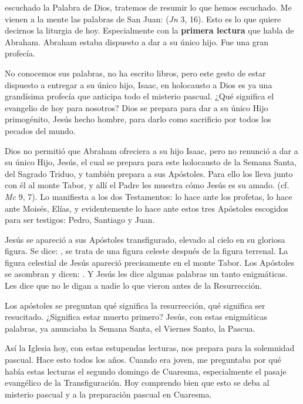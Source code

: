 \begin{body}
 escuchado la Palabra de Dios, tratemos de resumir lo que hemos escuchado. Me vienen a la mente las palabras de San Juan:  (\textit{Jn} 3, 16). Esto es lo que quiere decirnos la liturgia de hoy. Especialmente con la \textbf{primera lectura} que habla de Abraham. Abraham estaba dispuesto a dar a su único hijo. Fue una gran profecía.

No conocemos sus palabras, no ha escrito libros, pero este gesto de estar dispuesto a entregar a su único hijo, Isaac, en holocausto a Dios es ya una grandísima profecía que anticipa todo el misterio pascual. ¿Qué significa el evangelio de hoy para nosotros? Dios se prepara para dar a su único Hijo primogénito, Jesús hecho hombre, para darlo como sacrificio por todos los pecados del mundo.

Dios no permitió que Abraham ofreciera a su hijo Isaac, pero no renunció a dar a su único Hijo, Jesús, el cual se prepara para este holocausto de la Semana Santa, del Sagrado Triduo, y también prepara a sus Apóstoles. Para ello los lleva junto con él al monte Tabor, y allí el Padre les muestra cómo Jesús es su amado.  (cf. \textit{Mc} 9, 7). Lo manifiesta a los dos Testamentos: lo hace ante los profetas, lo hace ante Moisés, Elías, y evidentemente lo hace ante estos tres Apóstoles escogidos para ser testigos: Pedro, Santiago y Juan.

Jesús se apareció a sus Apóstoles transfigurado, elevado al cielo en su gloriosa figura. Se dice: , se trata de una figura celeste después de la figura terrenal. La figura celestial de Jesús apareció precisamente en el monte Tabor. Los Apóstoles se asombran y dicen: . Y Jesús les dice algunas palabras un tanto enigmáticas. Les dice que no le digan a nadie lo que vieron antes de la Resurrección.

Los apóstoles se preguntan qué significa la resurrección, qué significa ser resucitado. ¿Significa estar muerto primero? Jesús, con estas enigmáticas palabras, ya anunciaba la Semana Santa, el Viernes Santo, la Pascua.

Así la Iglesia hoy, con estas estupendas lecturas, nos prepara para la solemnidad pascual. Hace esto todos los años. Cuando era joven, me preguntaba por qué había estas lecturas el segundo domingo de Cuaresma, especialmente el pasaje evangélico de la Transfiguración. Hoy comprendo bien que esto se deba al misterio pascual y a la preparación pascual en Cuaresma.


\end{body}
